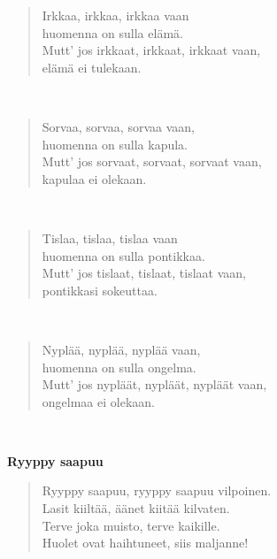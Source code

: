 \noindent\begin{minipage}{\linewidth}
\begin{verse}
	Irkkaa, irkkaa, irkkaa vaan\\
	huomenna on sulla elämä.\\
	Mutt' jos irkkaat, irkkaat, irkkaat vaan,\\
	elämä ei tulekaan.\\
\end{verse}
\end{minipage}\\[10pt]
\noindent\begin{minipage}{\linewidth}
\begin{verse}
	Sorvaa, sorvaa, sorvaa vaan,\\
	huomenna on sulla kapula.\\
	Mutt' jos sorvaat, sorvaat, sorvaat vaan,\\
	kapulaa ei olekaan.\\
\end{verse}
\end{minipage}\\[10pt]
\noindent\begin{minipage}{\linewidth}
\begin{verse}
	Tislaa, tislaa, tislaa vaan\\
	huomenna on sulla pontikkaa.\\
	Mutt' jos tislaat, tislaat, tislaat vaan,\\
	pontikkasi sokeuttaa.\\
\end{verse}
\end{minipage}\\[10pt]
\noindent\begin{minipage}{\linewidth}
\begin{verse}
	Nyplää, nyplää, nyplää vaan,\\
	huomenna on sulla ongelma.\\
	Mutt' jos nypläät, nypläät, nypläät vaan,\\
	ongelmaa ei olekaan.\\
\end{verse}
\end{minipage}\\[10pt]
%
%
\noindent\begin{minipage}{\linewidth}
\vspace{5pt}
\parbox[t]{0.85\linewidth}{\raggedright {\large\bf Ryyppy saapuu}\\[6pt]}
\begin{verse}
	
	Ryyppy saapuu, ryyppy saapuu vilpoinen.\\
	Lasit kiiltää, äänet kiitää kilvaten.\\
	Terve joka muisto, terve kaikille.\\
	Huolet ovat haihtuneet, siis maljanne!\\
\end{verse}
\end{minipage}\\[10pt]
